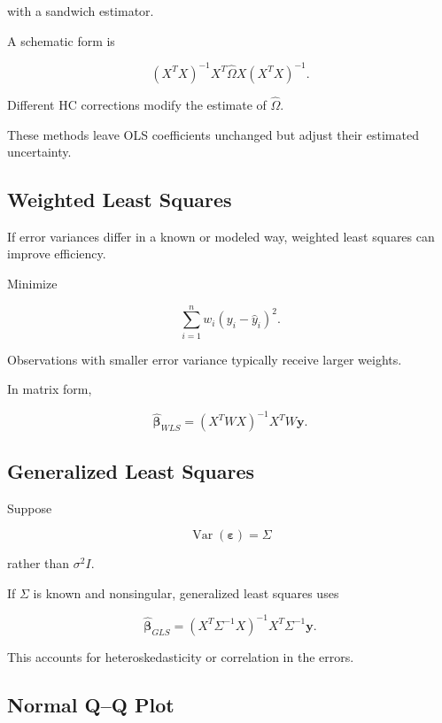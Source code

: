 with a sandwich estimator.

A schematic form is

\[
\boxed{
(X^TX)^{-1}
X^T
\widehat{\Omega}
X
(X^TX)^{-1}.
}
\]

Different HC corrections modify the estimate of
\(\widehat{\Omega}\).

These methods leave OLS coefficients unchanged but adjust their estimated
uncertainty.

\subsection{Weighted Least Squares}
\label{subsec:weighted-least-squares}

If error variances differ in a known or modeled way, weighted least
squares can improve efficiency.

Minimize

\[
\boxed{
\sum_{i=1}^{n}
w_i
(y_i-\widehat{y}_i)^2.
}
\]

Observations with smaller error variance typically receive larger
weights.

In matrix form,

\[
\boxed{
\widehat{\boldsymbol{\beta}}_{WLS}
=
(X^TWX)^{-1}
X^TW\mathbf{y}.
}
\]

\subsection{Generalized Least Squares}
\label{subsec:generalized-least-squares}

Suppose

\[
\operatorname{Var}
(
\boldsymbol{\varepsilon}
)
=
\Sigma
\]

rather than \(\sigma^2I\).

If \(\Sigma\) is known and nonsingular, generalized least squares uses

\[
\boxed{
\widehat{\boldsymbol{\beta}}_{GLS}
=
(X^T\Sigma^{-1}X)^{-1}
X^T\Sigma^{-1}\mathbf{y}.
}
\]

This accounts for heteroskedasticity or correlation in the errors.

\subsection{Normal Q--Q Plot}
\label{subsec:normal-qq-regression}

